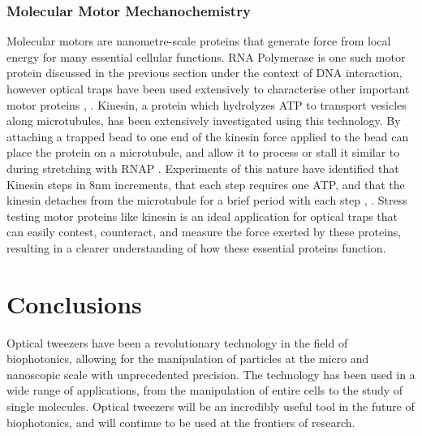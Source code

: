 \documentclass{article}
\begin{document}
\subsubsection*{Molecular Motor Mechanochemistry}

Molecular motors are nanometre-scale proteins that generate force from local energy for many essential cellular functions. RNA Polymerase is one such motor protein discussed in the previous section under the context of DNA interaction, however optical traps have been used extensively to characterise other important motor proteins \cite{Bustamante2021}, \cite{Lang2003-ll}. Kinesin, a protein which hydrolyzes ATP to transport vesicles along microtubules, has been extensively investigated using this technology. By attaching a trapped bead to one end of the kinesin force applied to the bead can place the protein on a microtubule, and allow it to process or stall it similar to during stretching with RNAP \cite{Block1990}. Experiments of this nature have identified that Kinesin steps in 8nm increments, that each step requires one ATP, and that the kinesin detaches from the microtubule for a brief period with each step \cite{Lang2003-ll}, \cite{Block1990}. Stress testing motor proteins like kinesin is an ideal application for optical traps that can easily contest, counteract, and measure the force exerted by these proteins, resulting in a clearer understanding of how these essential proteins function.



\section*{Conclusions}

Optical tweezers have been a revolutionary technology in the field of biophotonics, allowing for the manipulation of particles at the micro and nanoscopic scale with unprecedented precision. The technology has been used in a wide range of applications, from the manipulation of entire cells to the study of single molecules. Optical tweezers will be an incredibly useful tool in the future of biophotonics, and will continue to be used at the frontiers of research.

\newpage


\end{document}

